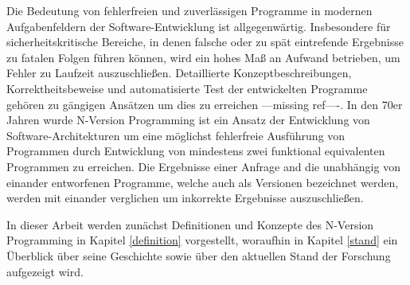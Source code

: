 Die Bedeutung von fehlerfreien und zuverlässigen Programme in modernen Aufgabenfeldern der Software-Entwicklung ist allgegenwärtig.
Insbesondere für sicherheitskritische Bereiche, in denen falsche oder zu spät eintrefende Ergebnisse zu fatalen Folgen führen können, wird ein hohes Maß an Aufwand betrieben, um Fehler zu Laufzeit auszuschließen.
Detaillierte Konzeptbeschreibungen, Korrektheitsbeweise und automatisierte Test der entwickelten Programme gehören zu gängigen Ansätzen um dies zu erreichen ---missing ref----.
In den 70er Jahren wurde 
N-Version Programming ist ein Ansatz der Entwicklung von Software-Architekturen um eine möglichst fehlerfreie Ausführung von Programmen durch Entwicklung von mindestens zwei funktional equivalenten Programmen zu erreichen.
Die Ergebnisse einer Anfrage and die unabhängig von einander entworfenen Programme, welche auch als Versionen bezeichnet werden, werden mit einander verglichen um inkorrekte Ergebnisse auszuschließen.


In dieser Arbeit werden zunächst Definitionen und Konzepte des N-Version Programming in Kapitel \ref{definition} vorgestellt, woraufhin in Kapitel \ref{stand} ein Überblick über seine Geschichte sowie über den aktuellen Stand der Forschung aufgezeigt wird.